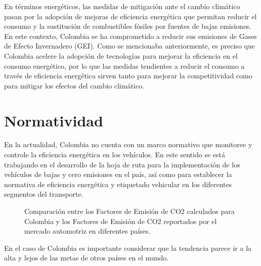 En términos energéticos, las medidas de mitigación ante el cambio climático pasan por la adopción de mejoras de eficiencia energética que permitan reducir el consumo y la sustitución de combustibles fósiles por fuentes de bajas emisiones. En este contexto, Colombia se ha comprometido a reducir sus emisiones de Gases de Efecto Invernadero (GEI). \cite{Plan_Energetico-2050} Como se mencionaba anteriormente, es preciso que Colombia acelere la adopción de tecnologías para mejorar la eficiencia en el consumo energético, por lo que las medidas tendientes a reducir el consumo a través de eficiencia energética sirven tanto para mejorar la competitividad como para mitigar los efectos del cambio climático.



\section{Normatividad}

En la actualidad, Colombia no cuenta con un marco normativo que monitoree y controle la eficiencia energética en los vehículos. En este sentido se está trabajando en el desarrollo de la hoja de ruta para la implementación de los vehículos de bajas y cero emisiones en el país, así como para establecer la normativa de eficiencia energética y etiquetado vehicular en los diferentes segmentos del transporte. \cite{Baseline_Pereira_2020}

\begin{figure}[htbp]
   \centering
   
    \caption{Comparación entre los Factores de Emisión de CO2 calculados para Colombia y los Factores de Emisión de CO2 reportados por el mercado automotriz en diferentes países. \cite{ICCT_Performance_2020}}
    \label{fig:linebaseclase}
\end{figure}

En el caso de Colombia es importante considerar que la tendencia parece ir a la alta y lejos de las metas de otros países en el mundo.